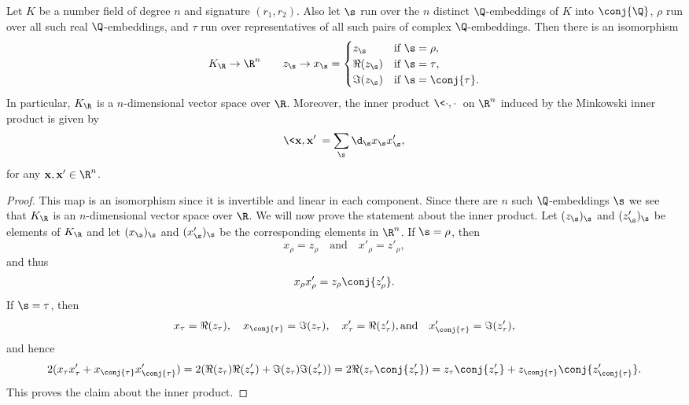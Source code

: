     \begin{proposition}\label{prop:Minkowski_space_isomorphism}
      Let $K$ be a number field of degree $n$ and signature $(r_{1},r_{2})$. Also let $\s$ run over the $n$ distinct $\Q$-embeddings of $K$ into $\conj{\Q}$, $\rho$ run over all such real $\Q$-embeddings, and $\tau$ run over representatives of all such pairs of complex $\Q$-embeddings. Then there is an isomorphism
      \[
        K_{\R} \to \R^{n} \qquad z_{\s} \to x_{\s} = \begin{cases} z_{\s} & \text{if $\s = \rho$}, \\ \Re(z_{\s}) & \text{if $\s = \tau$}, \\ \Im(z_{\s}) & \text{if $\s = \conj{\tau}$}. \end{cases}
      \]
      In particular, $K_{\R}$ is a $n$-dimensional vector space over $\R$. Moreover, the inner product $\<\cdot,\cdot\>$ on $\R^{n}$ induced by the Minkowski inner product is given by
      \[
        \<\mathbf{x},\mathbf{x}'\> = \sum_{\s}\d_{\s}x_{\s}x'_{\s},
      \]
      for any $\mathbf{x},\mathbf{x}' \in \R^{n}$.
    \end{proposition}
    \begin{proof}
      This map is an isomorphism since it is invertible and linear in each component. Since there are $n$ such $\Q$-embeddings $\s$ we see that $K_{\R}$ is an $n$-dimensional vector space over $\R$. We will now prove the statement about the inner product. Let $(z_{\s})_{\s}$ and $(z'_{\s})_{\s}$ be elements of $K_{\R}$ and let $(x_{\s})_{\s}$ and $(x'_{\s})_{\s}$ be the corresponding elements in $\R^{n}$. If $\s = \rho$, then
      \[
        x_{\rho} = z_{\rho} \quad \text{and} \quad x'_{\rho} = z'_{\rho},
      \]
      and thus
      \[
        x_{\rho}x'_{\rho} = z_{\rho}\conj{z'_{\rho}}.
      \]
      If $\s = \tau$, then
      \[
        x_{\tau} = \Re(z_{\tau}), \quad x_{\conj{\tau}} = \Im(z_{\tau}), \quad x'_{\tau} = \Re(z'_{\tau}), \text{and} \quad x'_{\conj{\tau}} = \Im(z'_{\tau}),
      \]
      and hence
      \[
        2(x_{\tau}x'_{\tau}+x_{\conj{\tau}}x'_{\conj{\tau}}) = 2(\Re(z_{\tau})\Re(z'_{\tau})+\Im(z_{\tau})\Im(z'_{\tau})) = 2\Re(z_{\tau}\conj{z'_{\tau}}) = z_{\tau}\conj{z'_{\tau}}+z_{\conj{\tau}}\conj{z'_{\conj{\tau}}}.
      \]
      This proves the claim about the inner product.
    \end{proof}
    
